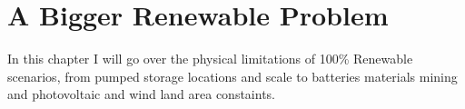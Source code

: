\setchapterpreamble[u]{\margintoc}
\chapter{A Bigger Renewable Problem}

In this chapter I will go over the physical limitations of 100\% Renewable scenarios, from pumped storage locations and scale to batteries materials mining and photovoltaic and wind land area constaints.
